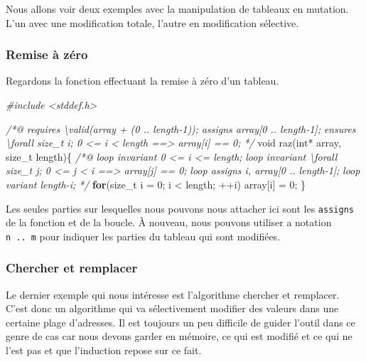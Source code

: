 \documentclass[12pt,francais,]{scrbook}
\newenvironment{Shaded}{}{}
\newcommand{\KeywordTok}[1]{\textcolor[rgb]{0.00,0.44,0.13}{\textbf{{#1}}}}
\newcommand{\DataTypeTok}[1]{\textcolor[rgb]{0.56,0.13,0.00}{{#1}}}
\newcommand{\DecValTok}[1]{\textcolor[rgb]{0.25,0.63,0.44}{{#1}}}
\newcommand{\CommentTok}[1]{\textcolor[rgb]{0.38,0.63,0.69}{\textit{{#1}}}}
\newcommand{\NormalTok}[1]{{#1}}
\begin{document}
Nous allons voir deux exemples avec la manipulation de tableaux en
mutation. L'un avec une modification totale, l'autre en modification
sélective.

\subsubsection{Remise à zéro}\label{remise-uxe0-zuxe9ro}

Regardons la fonction effectuant la remise à zéro d'un tableau.

\begin{footnotesize}\begin{Shaded}
\begin{Highlighting}[]
\CommentTok{#include <stddef.h>}

\CommentTok{/*@}
\CommentTok{  requires \textbackslash{}valid(array + (0 .. length-1));}
\CommentTok{  assigns  array[0 .. length-1];}
\CommentTok{  ensures  \textbackslash{}forall size_t i; 0 <= i < length ==> array[i] == 0;}
\CommentTok{*/}
\DataTypeTok{void} \NormalTok{raz(}\DataTypeTok{int}\NormalTok{* array, size_t length)\{}
  \CommentTok{/*@}
\CommentTok{    loop invariant 0 <= i <= length;}
\CommentTok{    loop invariant \textbackslash{}forall size_t j; 0 <= j < i ==> array[j] == 0;}
\CommentTok{    loop assigns i, array[0 .. length-1];}
\CommentTok{    loop variant length-i;}
\CommentTok{  */}
  \KeywordTok{for}\NormalTok{(size_t i = }\DecValTok{0}\NormalTok{; i < length; ++i)}
    \NormalTok{array[i] = }\DecValTok{0}\NormalTok{;}
\NormalTok{\}}
\end{Highlighting}
\end{Shaded}\end{footnotesize}

Les seules parties sur lesquelles nous pouvons nous attacher ici sont
les \texttt{assigns} de la fonction et de la boucle. À nouveau, nous
pouvons utiliser a notation \texttt{n\ ..\ m} pour indiquer les parties
du tableau qui sont modifiées.

\subsubsection{Chercher et remplacer}\label{chercher-et-remplacer}

Le dernier exemple qui nous intéresse est l'algorithme chercher et
remplacer. C'est donc un algorithme qui va sélectivement modifier des
valeurs dans une certaine plage d'adresses. Il est toujours un peu
difficile de guider l'outil dans ce genre de cas car nous devons garder
\og{}en mémoire\fg{}, ce qui est modifié et ce qui ne l'est pas et que
l'induction repose sur ce fait.
\end{document}
